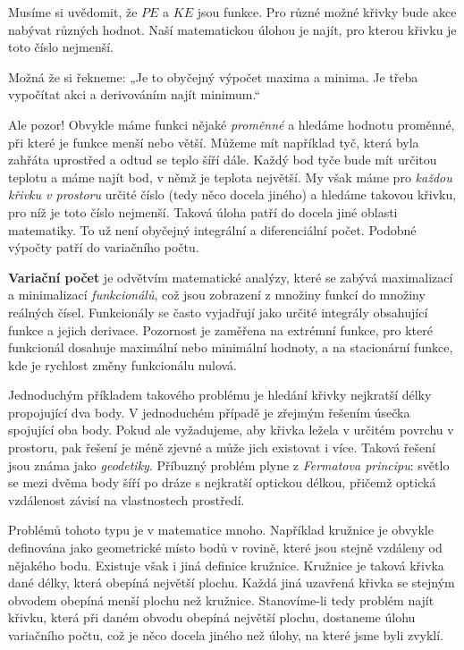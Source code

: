     Musíme si uvědomit, že \(PE\) a \(KE\) jsou funkce. Pro různé možné křivky bude akce nabývat
    různých hodnot. Naší matematickou úlohou je najít, pro kterou křivku je toto číslo nejmenší.

    Možná že si řekneme: „Je to obyčejný výpočet maxima a minima. Je třeba vypočítat akci a
    derivováním najít minimum.“

    Ale pozor! Obvykle máme funkci nějaké \emph{proměnné} a hledáme hodnotu proměnné, při které je
    funkce menší nebo větší. Můžeme mít například tyč, která byla zahřáta uprostřed a odtud se teplo
    šíří dále. Každý bod tyče bude mít určitou teplotu a máme najít bod, v němž je teplota největší.
    My však máme pro \emph{každou křivku v prostoru} určité číslo (tedy něco docela jiného) a
    hledáme takovou křivku, pro níž je toto číslo nejmenší. Taková úloha patří do docela jiné
    oblasti matematiky. To už není obyčejný integrální a diferenciální počet. Podobné výpočty patří
    do variačního počtu.
    
    \begin{tcnote}  
      \textbf{Variační počet} je odvětvím matematické analýzy, které se zabývá maximalizací a
      minimalizací \emph{funkcionálů}, což jsou zobrazení z množiny funkcí do množiny reálných
      čísel. Funkcionály se často vyjadřují jako určité integrály obsahující funkce a jejich
      derivace. Pozornost je zaměřena na extrémní funkce, pro které funkcionál dosahuje maximální
      nebo minimální hodnoty, a na stacionární funkce, kde je rychlost změny funkcionálu nulová.
  
      Jednoduchým příkladem takového problému je hledání křivky nejkratší délky propojující dva
      body. V jednoduchém případě je zřejmým řešením úsečka spojující oba body. Pokud ale
      vyžadujeme, aby křivka ležela v určitém povrchu v prostoru, pak řešení je méně zjevné a může
      jich existovat i více. Taková řešení jsou známa jako \emph{geodetiky}. Příbuzný problém plyne
      z \emph{Fermatova principu}: světlo se mezi dvěma body šíří po dráze s nejkratší optickou
      délkou, přičemž optická vzdálenost závisí na vlastnostech prostředí. 
      
      Problémů tohoto typu je v matematice mnoho. Například kružnice je obvykle definována jako
      geometrické místo bodů v rovině, které jsou stejně vzdáleny od nějakého bodu. Existuje však i
      jiná definice kružnice. Kružnice je taková křivka dané délky, která obepíná největší plochu.
      Každá jiná uzavřená křivka se stejným obvodem obepíná menší plochu než kružnice. Stanovíme-li
      tedy problém najít křivku, která při daném obvodu obepíná největší plochu, dostaneme úlohu
      variačního počtu, což je něco docela jiného než úlohy, na které jsme byli zvyklí.
    \end{tcnote}

